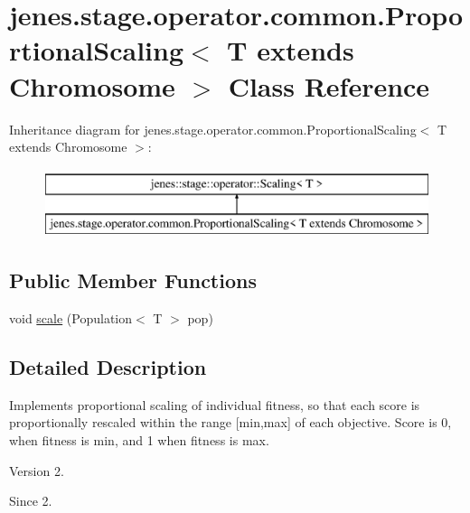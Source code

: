 \hypertarget{classjenes_1_1stage_1_1operator_1_1common_1_1_proportional_scaling_3_01_t_01extends_01_chromosome_01_4}{\section{jenes.\-stage.\-operator.\-common.\-Proportional\-Scaling$<$ T extends Chromosome $>$ Class Reference}
\label{classjenes_1_1stage_1_1operator_1_1common_1_1_proportional_scaling_3_01_t_01extends_01_chromosome_01_4}
}
Inheritance diagram for jenes.\-stage.\-operator.\-common.\-Proportional\-Scaling$<$ T extends Chromosome $>$\-:\begin{figure}[H]
\begin{center}
\leavevmode
\includegraphics[height=2.000000cm]{classjenes_1_1stage_1_1operator_1_1common_1_1_proportional_scaling_3_01_t_01extends_01_chromosome_01_4}
\end{center}
\end{figure}
\subsection*{Public Member Functions}
\begin{DoxyCompactItemize}
\item 
void \hyperlink{classjenes_1_1stage_1_1operator_1_1common_1_1_proportional_scaling_3_01_t_01extends_01_chromosome_01_4_a5b8ae9f116348cebc390e0a58602a704}{scale} (Population$<$ T $>$ pop)
\end{DoxyCompactItemize}


\subsection{Detailed Description}
Implements proportional scaling of individual fitness, so that each score is proportionally rescaled within the range \mbox{[}min,max\mbox{]} of each objective. Score is 0, when fitness is min, and 1 when fitness is max.

\begin{DoxyVersion}{Version}
2. 
\end{DoxyVersion}
\begin{DoxySince}{Since}
2. 
\end{DoxySince}


